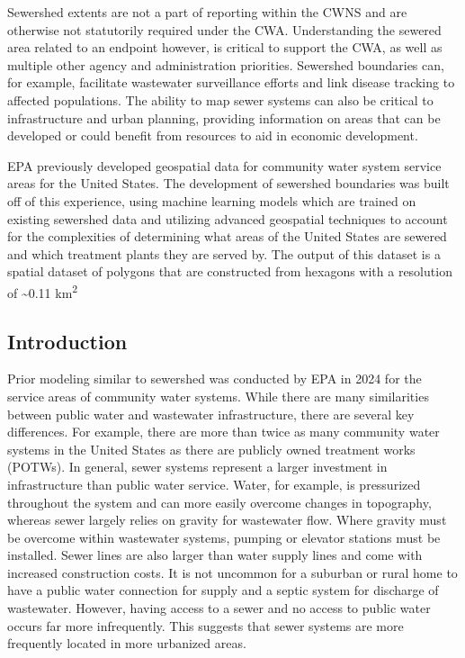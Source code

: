 \documentclass[
  letterpaper,
  DIV=11,
  numbers=noendperiod]{scrartcl}
\begin{document}
Sewershed extents are not a part of reporting within the CWNS and are
otherwise not statutorily required under the CWA. Understanding the
sewered area related to an endpoint however, is critical to support the
CWA, as well as multiple other agency and administration priorities.
Sewershed boundaries can, for example, facilitate wastewater
surveillance efforts and link disease tracking to affected populations.
The ability to map sewer systems can also be critical to infrastructure
and urban planning, providing information on areas that can be developed
or could benefit from resources to aid in economic development.

EPA previously developed geospatial data for community water system
service areas for the United States. The development of sewershed
boundaries was built off of this experience, using machine learning
models which are trained on existing sewershed data and utilizing
advanced geospatial techniques to account for the complexities of
determining what areas of the United States are sewered and which
treatment plants they are served by. The output of this dataset is a
spatial dataset of polygons that are constructed from hexagons with a
resolution of \textasciitilde0.11 km\textsuperscript{2}

\subsection{Introduction}\label{introduction}

Prior modeling similar to sewershed was conducted by EPA in 2024 for the
service areas of community water systems. While there are many
similarities between public water and wastewater infrastructure, there
are several key differences. For example, there are more than twice as
many community water systems in the United States as there are publicly
owned treatment works (POTWs). In general, sewer systems represent a
larger investment in infrastructure than public water service. Water,
for example, is pressurized throughout the system and can more easily
overcome changes in topography, whereas sewer largely relies on gravity
for wastewater flow. Where gravity must be overcome within wastewater
systems, pumping or elevator stations must be installed. Sewer lines are
also larger than water supply lines and come with increased construction
costs. It is not uncommon for a suburban or rural home to have a public
water connection for supply and a septic system for discharge of
wastewater. However, having access to a sewer and no access to public
water occurs far more infrequently. This suggests that sewer systems are
more frequently located in more urbanized areas.
\end{document}
